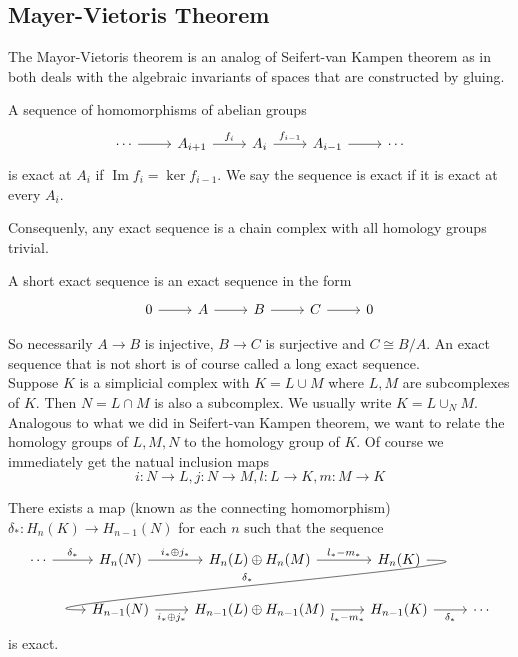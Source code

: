 \subsection{Mayer-Vietoris Theorem}
The Mayor-Vietoris theorem is an analog of Seifert-van Kampen theorem as in both deals with the algebraic invariants of spaces that are constructed by gluing.
\begin{definition}
    A sequence of homomorphisms of abelian groups
    \[
        \begin{tikzcd}
            \cdots\arrow{r}&A_{i+1}\arrow{r}{f_i}&A_i\arrow{r}{f_{i-1}}&A_{i-1}\arrow{r}&\cdots
        \end{tikzcd}
    \]
    is exact at $A_i$ if $\operatorname{Im}f_i=\ker f_{i-1}$.
    We say the sequence is exact if it is exact at every $A_i$.
\end{definition}
Consequenly, any exact sequence is a chain complex with all homology groups trivial.
\begin{definition}
    A short exact sequence is an exact sequence in the form
    \[
        \begin{tikzcd}
            0\arrow{r}&A\arrow{r}&B\arrow{r}&C\arrow{r}&0
        \end{tikzcd}
    \]
\end{definition}
So necessarily $A\to B$ is injective, $B\to C$ is surjective and $C\cong B/A$.
An exact sequence that is not short is of course called a long exact sequence.\\
Suppose $K$ is a simplicial complex with $K=L\cup M$ where $L,M$ are subcomplexes of $K$.
Then $N=L\cap M$ is also a subcomplex.
We usually write $K=L\cup_NM$.
Analogous to what we did in Seifert-van Kampen theorem, we want to relate the homology groups of $L,M,N$ to the homology group of $K$.
Of course we immediately get the natual inclusion maps
$$i:N\to L,j:N\to M,l:L\to K,m:M\to K$$
\begin{theorem}\label{mayer-vietoris}
    There exists a map (known as the connecting homomorphism) $\delta_\ast:H_n(K)\to H_{n-1}(N)$ for each $n$ such that the sequence
    \[
        \begin{tikzcd}
            \cdots\arrow{r}{\delta_\ast}&H_n(N)\arrow{r}{i_\ast\oplus j_\ast}&H_n(L)\oplus H_n(M)\arrow{r}{l_\ast-m_\ast}&H_n(K)\arrow[swap,overlay,out=0,in=180]{dll}{\delta_\ast}&\\
            &H_{n-1}(N)\arrow[swap]{r}{i_\ast\oplus j_\ast}&H_{n-1}(L)\oplus H_{n-1}(M)\arrow[swap]{r}{l_\ast-m_\ast}&H_{n-1}(K)\arrow[swap]{r}{\delta_\ast}&\cdots
        \end{tikzcd}
    \]
    is exact.
\end{theorem}
